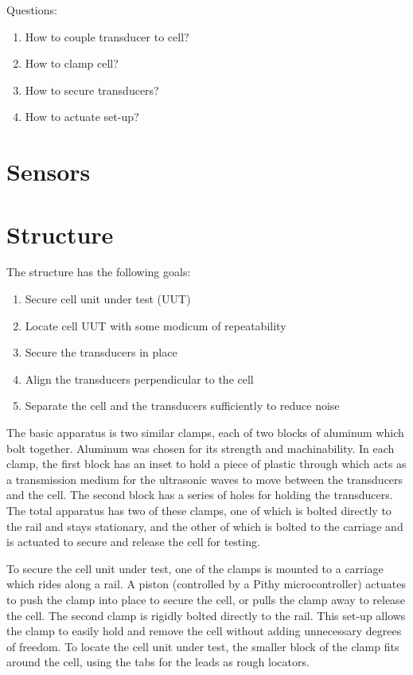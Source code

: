 Questions:
\begin{enumerate}
	\item How to couple transducer to cell?
	\item How to clamp cell?
	\item How to secure transducers?
    \item How to actuate set-up?
\end{enumerate}

\section{Sensors}

\section{Structure}
The structure has the following goals:
\begin{enumerate}
    \item Secure cell unit under test (UUT)
    \item Locate cell UUT with some modicum of repeatability
    \item Secure the transducers in place
    \item Align the transducers perpendicular to the cell
    \item Separate the cell and the transducers sufficiently to reduce noise
\end{enumerate}

The basic apparatus is two similar clamps, each of two blocks of aluminum which bolt together. Aluminum was chosen for its strength and machinability. In each clamp, the first block has an inset to hold a piece of plastic through which acts as a transmission medium for the ultrasonic waves to move between the transducers and the cell. The second block has a series of holes for holding the transducers. The total apparatus has two of these clamps, one of which is bolted directly to the rail and stays stationary, and the other of which is bolted to the carriage and is actuated to secure and release the cell for testing.

To secure the cell unit under test, one of the clamps is mounted to a carriage which rides along a rail. A piston (controlled by a Pithy microcontroller) actuates to push the clamp into place to secure the cell, or pulls the clamp away to release the cell. The second clamp is rigidly bolted directly to the rail. This set-up allows the clamp to easily hold and remove the cell without adding unnecessary degrees of freedom. To locate the cell unit under test, the smaller block of the clamp fits around the cell, using the tabs for the leads as rough locators.

